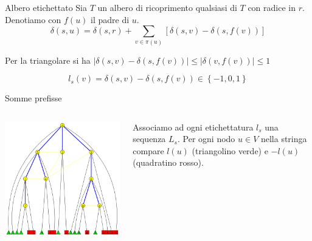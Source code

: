 \documentclass{beamer}
\theoremstyle{plain}
\theoremstyle{definition}
\theoremstyle{remark}
\newcommand{\set}[1]{\left\{#1\right\}}
\newcommand{\pa}[1]{\left(#1\right)}
\newcommand{\bra}[1]{\left[#1\right]}
\newcommand{\abs}[1]{\left|#1\right|}
\begin{document}
\begin{frame}{Albero etichettato}
  Sia $T$ un albero di ricoprimento qualsiasi di $T$ con radice in
  $r$. Denotiamo con $f(u)$ il padre di $u$.
  \vfill
  \[ \delta\pa{ s,u} = \delta\pa{ s,r} + \sum _{v\in \pi (u)} \bra{
    \delta\pa{ s,v} - \delta\pa{ s,f(v) } } \]
  
  Per la triangolare si ha $\abs{\delta\pa{ s,v} - \delta\pa{ s,f(v)}
  } \le \abs{\delta\pa{v,f(v)}} \le 1$ \vfill
  
  \pause
  \[ l_s(v) = \delta\pa{s,v} - \delta\pa{ s, f(v) } \in \set{
    -1,0,1} \]
\end{frame}

\begin{frame}{Somme prefisse}
  \begin{columns}
    \begin{column}{0.6\textwidth}
      \includegraphics[width=\textwidth]{labeltree}
    \end{column}
    \begin{column}{0.39\textwidth}
      Associamo ad ogni etichettatura $l_s$ una sequenza $L_s$.
      \vfill
      Per ogni nodo $u\in V$ nella stringa compare $l(u)$ (triangolino
      verde) e $-l(u)$ (quadratino rosso).
    \end{column}
  \end{columns}
\end{frame}
\end{document}
